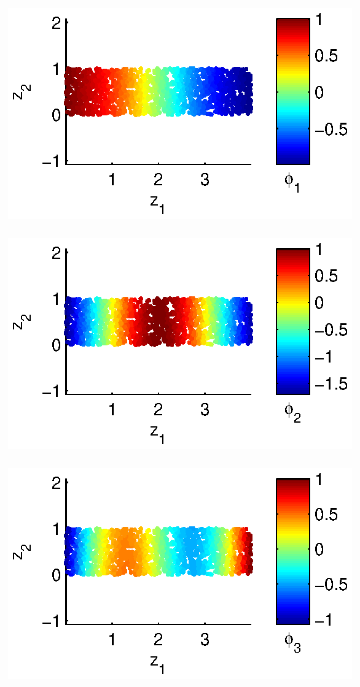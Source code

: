 \begin{figure}[t]
\centering
\begin{subfigure}{0.24\textwidth}
\includegraphics[width=\textwidth]{strip_discrete1}
\end{subfigure}
%
\begin{subfigure}{0.24\textwidth}
\includegraphics[width=\textwidth]{strip_discrete2}
\end{subfigure}
%
\begin{subfigure}{0.24\textwidth}
\includegraphics[width=\textwidth]{strip_discrete3}

\end{subfigure}
\end{figure}
